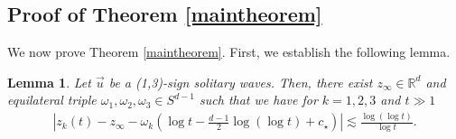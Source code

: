 \documentclass[reqno]{amsart}
\theoremstyle{plain}
\newtheorem{lemma}[theorem]{Lemma}
\theoremstyle{definition}
\numberwithin{equation}{section}
\newcommand{\1}{\mathbbm{1}}
\begin{document}
\subsection{Proof of Theorem \ref{maintheorem}}

We now prove Theorem \ref{maintheorem}. First, we establish the following lemma.
\begin{lemma}\label{modsitenai}
Let $\vec{u}$ be a (1,3)-sign solitary waves. Then, there exist $z_{\infty}\in \mathbb{R}^d$ and equilateral triple $\omega_1,\omega_2,\omega_3\in S^{d-1}$ such that we have for $k=1,2,3$ and $t\gg 1$
\begin{align}
\left|z_k(t)-z_{\infty}-\omega_k\left(\log{t}-\frac{d-1}{2}\log{(\log{t})}+c_{\star}\right)\right|\lesssim \frac{\log{(\log{t})}}{\log{t}}.
\end{align}
\end{lemma}
\end{document}
